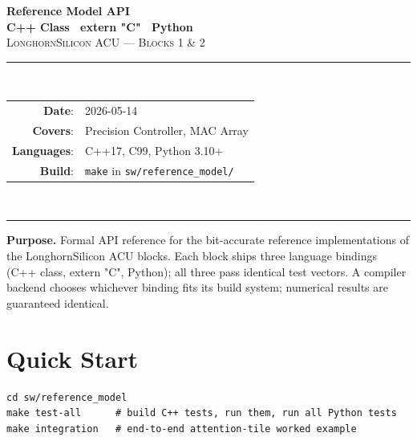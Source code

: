 \documentclass[11pt]{article}
\begin{document}
\thispagestyle{empty}
\begin{center}
\vspace*{1.2in}
{\Huge\bfseries Reference Model API}\\[0.4em]
{\LARGE\bfseries C++ Class \textperiodcentered\ extern "C" \textperiodcentered\ Python}\\[1.5em]

{\large \textsc{LonghornSilicon ACU --- Blocks 1 \& 2}}\\[2em]

\rule{0.7\textwidth}{0.4pt}\\[1em]

\begin{tabular}{rl}
\textbf{Date}:        & 2026-05-14 \\
\textbf{Covers}:      & Precision Controller, MAC Array \\
\textbf{Languages}:   & C++17, C99, Python 3.10+ \\
\textbf{Build}:       & \texttt{make} in \texttt{sw/reference\_model/} \\
\end{tabular}\\[1em]
\rule{0.7\textwidth}{0.4pt}

\vfill
\begin{minipage}{0.85\textwidth}
\small
\textbf{Purpose.} Formal API reference for the bit-accurate
reference implementations of the LonghornSilicon ACU blocks.
Each block ships three language bindings (C++ class, extern "C",
Python); all three pass identical test vectors. A compiler backend
chooses whichever binding fits its build system; numerical results
are guaranteed identical.
\end{minipage}

\vspace{0.3in}
\end{center}

\clearpage

\tableofcontents
\clearpage

\section{Quick Start}
\label{sec:quickstart}

\begin{lstlisting}[basicstyle=\ttfamily\small]
cd sw/reference_model
make test-all      # build C++ tests, run them, run all Python tests
make integration   # end-to-end attention-tile worked example
\end{lstlisting}
\end{document}
